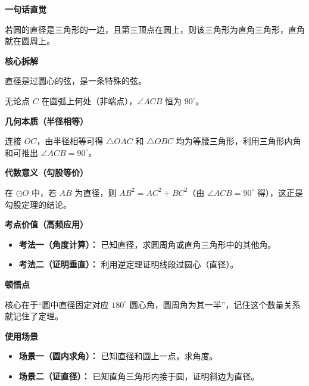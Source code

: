 \begin{explanationbox}
	\textbf{\textcolor{CExplanation}{一句话直觉}}

	若圆的直径是三角形的一边，且第三顶点在圆上，则该三角形为直角三角形，直角就在圆周上。

	\medskip
	\textbf{\textcolor{CExplanation}{核心拆解}}
	\begin{description}[style=nextline, leftmargin=2.8em, labelsep=0.5em, itemsep=0.45em]
		\item[\textbf{要点一（直径与圆）：}] 直径是过圆心的弦，是一条特殊的弦。
		\item[\textbf{要点二（圆周角固定）：}] 无论点 $C$ 在圆弧上何处（非端点），$\angle ACB$ 恒为 $90^\circ$。
	\end{description}

	\medskip
	\textbf{\textcolor{CExplanation}{几何本质（半径相等）}}

	连接 $OC$，由半径相等可得 $\triangle OAC$ 和 $\triangle OBC$ 均为等腰三角形，利用三角形内角和可推出 $\angle ACB=90^\circ$。

	\medskip
	\textbf{\textcolor{CExplanation}{代数意义（勾股等价）}}

	在 $\odot O$ 中，若 $AB$ 为直径，则 $AB^2 = AC^2 + BC^2$（由 $\angle ACB=90^\circ$ 得），这正是勾股定理的结论。

	\medskip
	\textbf{\textcolor{CExplanation}{考点价值（高频应用）}}
	\begin{itemize}[leftmargin=*, itemsep=0.5em, topsep=0.4em]
		\item \textbf{考法一（角度计算）：} 已知直径，求圆周角或直角三角形中的其他角。
		\item \textbf{考法二（证明垂直）：} 利用逆定理证明线段过圆心（直径）。
	\end{itemize}

	\medskip
	\textbf{\textcolor{CExplanation}{顿悟点}}

	核心在于“圆中直径固定对应 $180^\circ$ 圆心角，圆周角为其一半”，记住这个数量关系就记住了定理。

	\medskip
	\textbf{\textcolor{CExplanation}{使用场景}}
	\begin{itemize}[leftmargin=*, itemsep=0.5em, topsep=0.4em]
		\item \textbf{场景一（圆内求角）：} 已知直径和圆上一点，求角度。
		\item \textbf{场景二（证直径）：} 已知直角三角形内接于圆，证明斜边为直径。
	\end{itemize}
\end{explanationbox}
